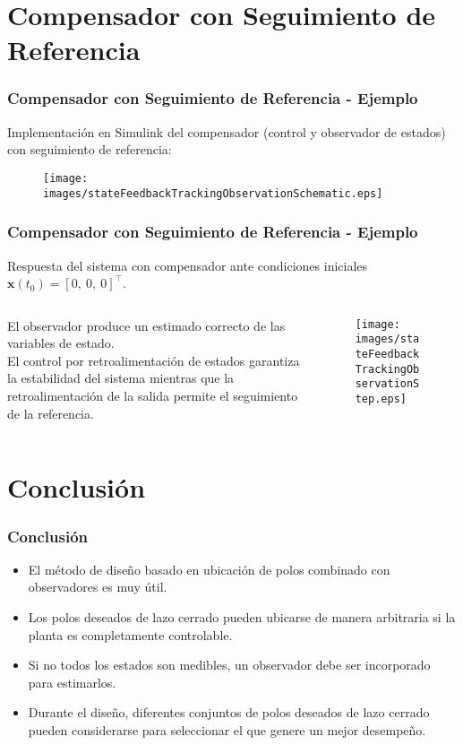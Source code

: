 \documentclass[aspectratio=169,handout]{beamer}
\theoremstyle{definition}
\theoremstyle{plain}
\theoremstyle{remark}
\begin{document}
\section{Compensador con Seguimiento de Referencia}
\begin{frame}[c]\frametitle{Compensador con Seguimiento de Referencia - Ejemplo}
	Implementación en Simulink del compensador (control y observador de estados) con seguimiento de referencia:
	\begin{figure}
		\centering
		\texttt{[image: images/stateFeedbackTrackingObservationSchematic.eps]}
	\end{figure}
\end{frame}

\begin{frame}[c]\frametitle{Compensador con Seguimiento de Referencia - Ejemplo}
	\small
	Respuesta del sistema con compensador ante condiciones iniciales $\mathbf{x}(t_0) = [0,\ 0,\ 0]^\intercal$.
	\vspace{-2mm}
	\begin{columns}
		\begin{column}{0.3\textwidth}
			\footnotesize El observador produce un estimado correcto de las variables de estado.\\
			\vspace{3mm}
			El control por retroalimentación de estados garantiza la estabilidad del sistema mientras que la retroalimentación de la salida permite el seguimiento de la referencia.
		\end{column}
		\begin{column}{0.7\textwidth}
			\begin{figure}
				\centering
				\texttt{[image: images/stateFeedbackTrackingObservationStep.eps]}
			\end{figure}
		\end{column}
	\end{columns}
\end{frame}

\section{Conclusión}
\begin{frame}[<+->]\frametitle{Conclusión}
	\begin{itemize}
		\item El método de diseño basado en ubicación de polos combinado con observadores es muy útil.
		\item Los polos deseados de lazo cerrado pueden ubicarse de manera arbitraria si la planta es completamente controlable.
		\item Si no todos los estados son medibles, un observador debe ser incorporado para estimarlos.
		\item Durante el diseño, diferentes conjuntos de polos deseados de lazo cerrado pueden considerarse para seleccionar el que genere un mejor desempeño.
	\end{itemize}
\end{frame}
\end{document}
